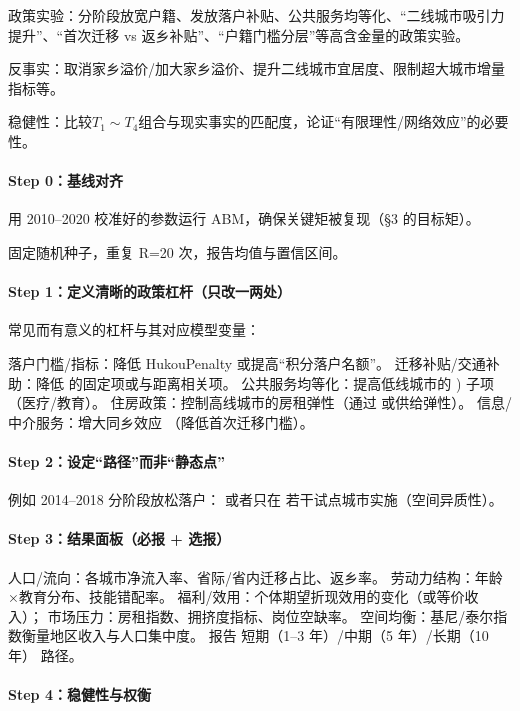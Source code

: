 \documentclass[master, final]{zufe-thesis}
\begin{document}
政策实验：分阶段放宽户籍、发放落户补贴、公共服务均等化、“二线城市吸引力提升”、“首次迁移 vs 返乡补贴”、“户籍门槛分层”等高含金量的政策实验。

反事实：取消家乡溢价/加大家乡溢价、提升二线城市宜居度、限制超大城市增量指标等。

稳健性：比较$T_1\sim T_4$组合与现实事实的匹配度，论证“有限理性/网络效应”的必要性。



\paragraph{Step 0：基线对齐}

用 2010–2020 校准好的参数运行 ABM，确保关键矩被复现（§3 的目标矩）。

固定随机种子，重复 
R=20 次，报告均值与置信区间。

\paragraph{Step 1：定义清晰的政策杠杆（只改一两处）}

常见而有意义的杠杆与其对应模型变量：

落户门槛/指标：降低 
HukouPenalty 或提高“积分落户名额”。
迁移补贴/交通补助：降低 
的固定项或与距离相关项。
公共服务均等化：提高低线城市的 ) 子项（医疗/教育）。
住房政策：控制高线城市的房租弹性（通过  或供给弹性）。
信息/中介服务：增大同乡效应 （降低首次迁移门槛）。

\paragraph{Step 2：设定“路径”而非“静态点”}

例如 2014–2018 分阶段放松落户：
或者只在 若干试点城市实施（空间异质性）。

\paragraph{Step 3：结果面板（必报 + 选报）}

人口/流向：各城市净流入率、省际/省内迁移占比、返乡率。
劳动力结构：年龄×教育分布、技能错配率。
福利/效用：个体期望折现效用的变化（或等价收入）；
市场压力：房租指数、拥挤度指标、岗位空缺率。
空间均衡：基尼/泰尔指数衡量地区收入与人口集中度。
报告 短期（1–3 年）/中期（5 年）/长期（10 年） 路径。

\paragraph{Step 4：稳健性与权衡}
\end{document}
